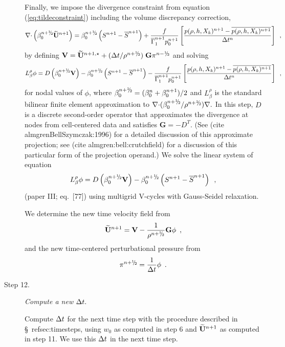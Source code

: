 \begin{description}
Finally, we impose the divergence constraint from equation (\ref{eq:tildeconstraint}) 
including the volume discrepancy correction,
\begin{equation}
\nablab \cdotb \left(\beta_0^{\nph} \Ubt^{n+1} \right)  = \beta_0^{\nph} \left(S^{n+1} - \overline{S}^{n+1} \right)
+ \frac{f}{\gammabar^{n+1} p_0^{n+1}}
\left[\frac{p(\rho,h,X_k)^{n+1} - \overline{p(\rho,h,X_k)^{n+1}}}{\Delta t^n}\right]
\enskip,
\end{equation}
by defining ${\bf V} = \Ubt^{n+1,\star} + ( \dt / \rho^\nph ) \; \mathbf{G} \pi^\nmh$ 
and solving
\begin{equation}
 L_\beta^\rho \phi =
   D \left ( \beta_0^{\nph} {\bf V} \right) - \beta_0^{\nph} \left(S^{n+1}-\overline{S}^{n+1} \right)
- \frac{f}{\gammabar^{n+1} p_0^{n+1}}
\left[\frac{p(\rho,h,X_k)^{n+1} - \overline{p(\rho,h,X_k)^{n+1}}}{\Delta t^n}\right] \enskip,
\end{equation}
for nodal values of $\phi$, where
$\beta_0^\nph = ( \beta_0^n + \beta_0^{n+1} )/2$ and
$L_\beta^\rho$ is the standard bilinear
finite element approximation to $\nablab \cdotb ({\beta_0^\nph}/{\rho^\nph}) \nablab.$
In this step, $D$ is a discrete second-order operator that approximates the 
divergence at nodes from cell-centered data and satisfies
$\mathbf{G} = -D^T.$ 
(See (cite almgrenBellSzymczak:1996) for a detailed discussion of this
approximate projection; see (cite almgren:bell:crutchfield) for a discussion
of this particular form of the projection operand.)  
We solve the linear system of equation
\begin{equation}
 L_\beta^\rho \phi =
   D \left ( \beta_0^{\nph} {\bf V} \right) - \beta_0^{\nph} \left(S^{n+1}-\overline{S}^{n+1} \right)\enskip,
\label{eq:nodal_solve}
\end{equation}
(paper III; eq.~[77]) using multigrid V-cycles with Gauss-Seidel relaxation.

We determine the new time velocity field from
\begin{equation}
\Ubt^{n+1} = {\bf V} - \frac{1}{\rho^\nph} \mathbf{G} \phi \enskip ,
\end{equation}
and the new time-centered perturbational pressure from
\begin{equation}
  \pi^\nph = \frac{1}{\dt} \phi \enskip .
\end{equation}

\item[Step 12.] {\em Compute a new $\Delta t.$}

Compute $\Delta t$ for the next time step with the procedure described in \S~ref{sec:timesteps},
using $w_0$ as computed in step 6 and
$\widetilde{{\bf U}}^{n+1}$ as computed in step 11.  We use this $\Delta t$ in the next time step. 


\end{description}

